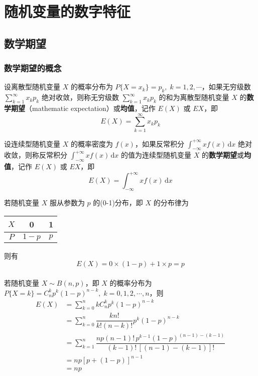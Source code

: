 \chapter{随机变量的数字特征}

\section{数学期望}

\subsection{数学期望的概念}

\begin{definition}
    设离散型随机变量 $X$ 的概率分布为 $P\{X=x_k\} = p_k, \; k=1,2,\cdots$，如果无穷级数 $\displaystyle\sum_{k=1}^{\infty} x_k p_k$ 绝对收敛，则称无穷级数 $\displaystyle\sum_{k=1}^{\infty} x_k p_k$ 的和为离散型随机变量 $X$ 的\textbf{数学期望}（mathematic expectation）或\textbf{均值}，记作 $E(X)$ 或 $EX$，即
    $$
    E(X) = \sum_{k=1}^{\infty} x_k p_k
    $$

    设连续型随机变量 $X$ 的概率密度为 $f(x)$，如果反常积分 $\displaystyle\int_{-\infty}^{+\infty} x f(x) \, \text{d}x$ 绝对收敛，则称反常积分 $\displaystyle\int_{-\infty}^{+\infty} x f(x) \, \text{d}x$ 的值为连续型随机变量 $X$ 的\textbf{数学期望}或\textbf{均值}，记作 $E(X)$ 或 $EX$，即
    $$
    E(X) = \int_{-\infty}^{+\infty} x f(x) \, \text{d}x
    $$
\end{definition}

若随机变量 $X$ 服从参数为 $p$ 的(0-1)分布，即 $X$ 的分布律为

\begin{table}[htbp]
    \centering

    \begin{tabular}{c | c c}
        \hline
        $X$ & 0 & 1 \\
        \hline
        $P$ & $1-p$ & $p$ \\
        \hline
    \end{tabular}
\end{table}
则有
$$
E(X) = 0 \times (1-p) + 1 \times p = p
$$
\\

若随机变量 $X \sim B(n,p)$，即 $X$ 的概率分布为 $P\{X=k\} = C_n^k p^k (1-p)^{n-k}, \; k=0,1,2,\cdots,n$，则
$$
\begin{aligned}
    E(X) &= \sum_{k=0}^n k C_n^k p^k (1-p)^{n-k} \\
    &= \sum_{k=0}^n \dfrac{kn!}{k! (n-k)!} p^k (1-p)^{n-k} \\
    &= \sum_{k=1}^n \dfrac{np(n-1)! \, p^{k-1} (1-p)^{(n-1)-(k-1)}}{(k-1)! \, [(n-1)-(k-1)]!} \\
    &= np[p+(1-p)]^{n-1} \\
    &= np
\end{aligned}
$$

